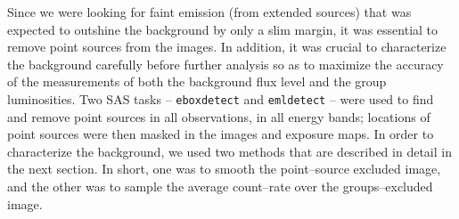 Since we were looking for faint emission (from extended sources) that
was expected to outshine the background by only a slim margin, it was
essential to remove point sources from the images.  In addition, it
was crucial to characterize the background carefully before further
analysis so as to maximize the accuracy of the measurements of both
the background flux level and the group luminosities.  Two SAS tasks
-- {\tt eboxdetect} and {\tt emldetect} -- were used to find and
remove point sources in all observations, in all energy bands;
locations of point sources were then masked in the images and exposure
maps.  In order to characterize the background, we used two methods
that are described in detail in the next section.  In short, one was
to smooth the point--source excluded image, and the other was to
sample the average count--rate over the groups--excluded image.

